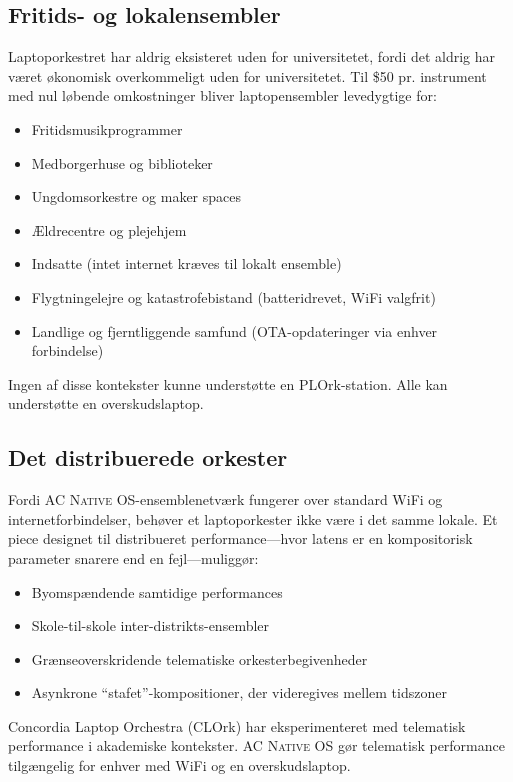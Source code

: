 \documentclass[10pt,letterpaper,twocolumn]{article}
\newcommand{\acos}{\textsc{AC Native OS}}
\begin{document}
\subsection{Fritids- og lokalensembler}

Laptoporkestret har aldrig eksisteret uden for universitetet, fordi det aldrig har v{\ae}ret {\o}konomisk overkommeligt uden for universitetet. Til \$50 pr. instrument med nul l{\o}bende omkostninger bliver laptopensembler levedygtige for:

\begin{itemize}
  \item Fritidsmusikprogrammer
  \item Medborgerhuse og biblioteker
  \item Ungdomsorkestre og maker spaces
  \item {\AE}ldrecentre og plejehjem
  \item Indsatte (intet internet kr{\ae}ves til lokalt ensemble)
  \item Flygtningelejre og katastrofebistand (batteridrevet, WiFi valgfrit)
  \item Landlige og fjerntliggende samfund (OTA-opdateringer via enhver forbindelse)
\end{itemize}

Ingen af disse kontekster kunne underst{\o}tte en PLOrk-station. Alle kan underst{\o}tte en overskudslaptop.

\subsection{Det distribuerede orkester}

Fordi \acos{}-ensemblenetv{\ae}rk fungerer over standard WiFi og internetforbindelser, beh{\o}ver et laptoporkester ikke v{\ae}re i det samme lokale. Et piece designet til distribueret performance---hvor latens er en kompositorisk parameter snarere end en fejl---muligg{\o}r:

\begin{itemize}
  \item Byomsp{\ae}ndende samtidige performances
  \item Skole-til-skole inter-distrikts-ensembler
  \item Gr{\ae}nseoverskridende telematiske orkesterbegivenheder
  \item Asynkrone ``stafet''-kompositioner, der videregives mellem tidszoner
\end{itemize}

Concordia Laptop Orchestra (CLOrk) har eksperimenteret med telematisk performance i akademiske kontekster. \acos{} g{\o}r telematisk performance tilg{\ae}ngelig for enhver med WiFi og en overskudslaptop.
\end{document}
